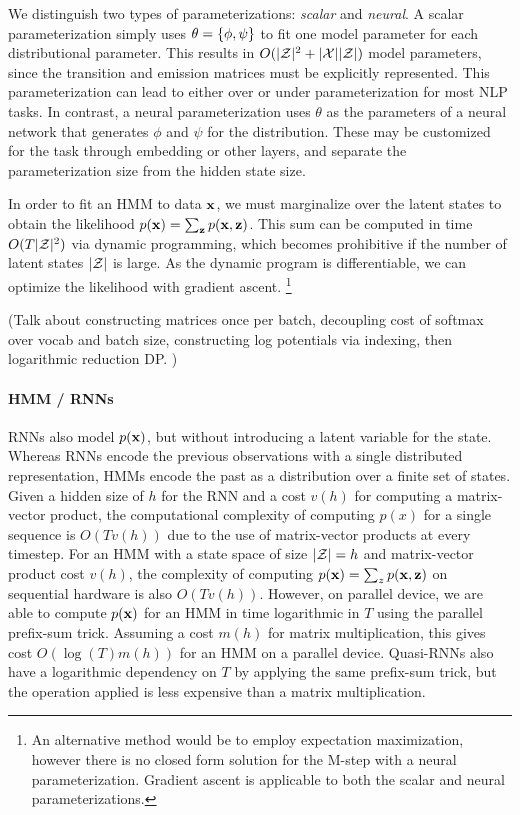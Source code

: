 \documentclass[11pt,a4paper]{article}
\begin{document}
We distinguish two types of parameterizations: \textit{scalar} and \textit{neural}.
A scalar parameterization simply uses $\theta = \left\{\phi,\psi\right\}$ to fit one model parameter for
each distributional parameter.
This results in $O(|\mathcal{Z}|^2 + |\mathcal{X}||\mathcal{Z}|)$ model parameters,
since the transition and emission matrices must be explicitly represented.
This parameterization can lead to either over or under parameterization for most NLP tasks.
In contrast, a neural parameterization uses $\theta$ as the parameters of a neural network
that generates $\phi$ and $\psi$ for the distribution.
These may be customized for the task through embedding or other layers,
and separate the parameterization size from the hidden state size. 

In order to fit an HMM to data $\mathbf{x}$,
we must marginalize over the latent states to obtain the likelihood
$p(\mathbf{x}) = \sum_{\mathbf{z}}p(\mathbf{x},\mathbf{z})$.
This sum can be computed in time $O(T|\mathcal{Z}|^2)$ via dynamic programming,
which becomes prohibitive if the number of latent states $|\mathcal{Z}|$ is large.
As the dynamic program is differentiable, we can optimize the likelihood 
with gradient ascent.
\footnote{An alternative method would be to employ expectation maximization,
however there is no closed form solution for the M-step with a neural parameterization.
Gradient ascent is applicable to both the scalar and neural parameterizations.}

(Talk about constructing matrices once per batch,
decoupling cost of softmax over vocab and batch size,
constructing log potentials via indexing,
then logarithmic reduction DP. )

\paragraph{ HMM / RNNs}
RNNs also model $p(\mathbf{x})$, but without introducing a latent variable for the state.
Whereas RNNs encode the previous observations with a single distributed representation,
HMMs encode the past as a distribution over a finite set of states.
Given a hidden size of $h$ for the RNN and a cost $v(h)$ for computing
a matrix-vector product, the computational complexity of
computing $p(x)$ for a single sequence is $O(Tv(h))$ due to the use
of matrix-vector products at every timestep.
For an HMM with a state space of size $|\mathcal{Z}| = h$ and matrix-vector product cost $v(h)$,
the complexity of computing $p(\mathbf{x}) = \sum_z p(\mathbf{x},\mathbf{z})$ on sequential
hardware is also $O(Tv(h))$.
However, on parallel device, we are able to compute $p(\mathbf{x})$
for an HMM in time logarithmic in $T$ using the parallel prefix-sum trick. 
Assuming a cost $m(h)$ for matrix multiplication, this gives cost
$O(\log(T)m(h))$ for an HMM on a parallel device.
Quasi-RNNs \citep{bradbury2016qrnn} also have a logarithmic dependency on $T$
by applying the same prefix-sum trick, but the operation applied is 
less expensive than a matrix multiplication.
\end{document}
